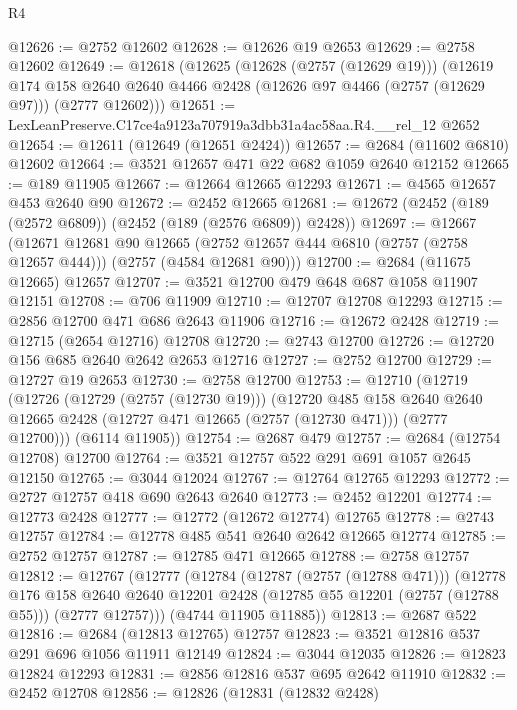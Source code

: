 \begin{lexlean}{R4}
\begin{coremodule}
@12626 := @2752 @12602
@12628 := @12626 @19 @2653
@12629 := @2758 @12602
@12649 := @12618
    (@12625
      (@12628 (@2757 (@12629 @19)))
      (@12619
        @174
        @158
        @2640
        @2640
        @4466
        @2428
        (@12626 @97 @4466 (@2757 (@12629 @97)))
        (@2777 @12602)))
@12651 := LexLeanPreserve.C17ce4a9123a707919a3dbb31a4ac58aa.R4.__rel_12 @2652
@12654 := @12611 (@12649 (@12651 @2424))
@12657 := @2684 (@11602 @6810) @12602
@12664 := @3521 @12657 @471 @22 @682 @1059 @2640 @12152
@12665 := @189 @11905
@12667 := @12664 @12665 @12293
@12671 := @4565 @12657 @453 @2640 @90
@12672 := @2452 @12665
@12681 := @12672 (@2452 (@189 (@2572 @6809)) (@2452 (@189 (@2576 @6809)) @2428))
@12697 := @12667
    (@12671
      @12681
      @90
      @12665
      (@2752 @12657 @444 @6810 (@2757 (@2758 @12657 @444)))
      (@2757 (@4584 @12681 @90)))
@12700 := @2684 (@11675 @12665) @12657
@12707 := @3521 @12700 @479 @648 @687 @1058 @11907 @12151
@12708 := @706 @11909
@12710 := @12707 @12708 @12293
@12715 := @2856 @12700 @471 @686 @2643 @11906
@12716 := @12672 @2428
@12719 := @12715 (@2654 @12716) @12708
@12720 := @2743 @12700
@12726 := @12720 @156 @685 @2640 @2642 @2653 @12716
@12727 := @2752 @12700
@12729 := @12727 @19 @2653
@12730 := @2758 @12700
@12753 := @12710
    (@12719
      (@12726
        (@12729 (@2757 (@12730 @19)))
        (@12720
          @485
          @158
          @2640
          @2640
          @12665
          @2428
          (@12727 @471 @12665 (@2757 (@12730 @471)))
          (@2777 @12700)))
      (@6114 @11905))
@12754 := @2687 @479
@12757 := @2684 (@12754 @12708) @12700
@12764 := @3521 @12757 @522 @291 @691 @1057 @2645 @12150
@12765 := @3044 @12024
@12767 := @12764 @12765 @12293
@12772 := @2727 @12757 @418 @690 @2643 @2640
@12773 := @2452 @12201
@12774 := @12773 @2428
@12777 := @12772 (@12672 @12774) @12765
@12778 := @2743 @12757
@12784 := @12778 @485 @541 @2640 @2642 @12665 @12774
@12785 := @2752 @12757
@12787 := @12785 @471 @12665
@12788 := @2758 @12757
@12812 := @12767
    (@12777
      (@12784
        (@12787 (@2757 (@12788 @471)))
        (@12778
          @176
          @158
          @2640
          @2640
          @12201
          @2428
          (@12785 @55 @12201 (@2757 (@12788 @55)))
          (@2777 @12757)))
      (@4744 @11905 @11885))
@12813 := @2687 @522
@12816 := @2684 (@12813 @12765) @12757
@12823 := @3521 @12816 @537 @291 @696 @1056 @11911 @12149
@12824 := @3044 @12035
@12826 := @12823 @12824 @12293
@12831 := @2856 @12816 @537 @695 @2642 @11910
@12832 := @2452 @12708
@12856 := @12826
    (@12831
      (@12832 @2428)

\end{coremodule}
\end{lexlean}
